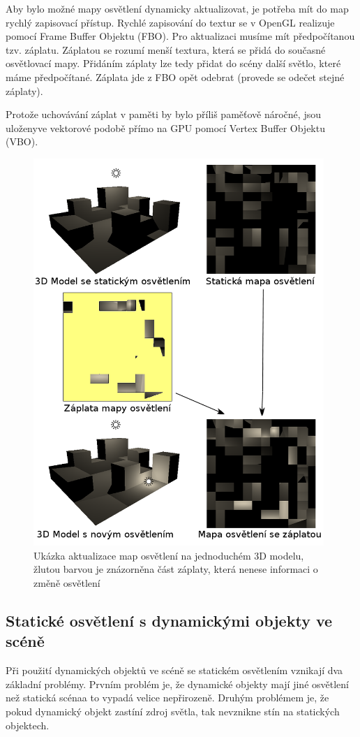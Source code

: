 \documentclass[11pt,twoside,a4paper]{book}
\begin{document}
Aby bylo možné mapy osvětlení dynamicky aktualizovat, je potřeba mít do map rychlý zapisovací přístup. Rychlé zapisování do textur se v OpenGL realizuje pomocí Frame Buffer Objektu (FBO). Pro aktualizaci musíme mít předpočítanou tzv. záplatu. Záplatou se rozumí menší textura, která se přidá do současné osvětlovací mapy. Přidáním záplaty lze tedy přidat do scény další světlo, které máme předpočítané. Záplata jde z FBO opět odebrat (provede se odečet stejné záplaty).

Protože uchovávání záplat v paměti by bylo příliš paměťově náročné, jsou uloženy\linebreak ve vektorové podobě přímo na GPU pomocí Vertex Buffer Objektu (VBO). 
\newpage

\begin{center}
\begin{figure}[h!]
\includegraphics[width=110mm]{figures/lmupdate.png}
\caption{Ukázka aktualizace map osvětlení na jednoduchém 3D modelu, žlutou barvou je znázorněna část záplaty, která nenese informaci o změně osvětlení}
\end{figure}
\end{center}

\subsection{Statické osvětlení s dynamickými objekty ve scéně}
Při použití dynamických objektů ve scéně se statickém osvětlením vznikají dva základní problémy. Prvním problém je, že dynamické objekty mají jiné osvětlení než statická scéna\linebreak a to vypadá velice nepřirozeně. Druhým problémem je, že pokud dynamický objekt zastíní zdroj světla, tak nevznikne stín na statických objektech.
\end{document}
